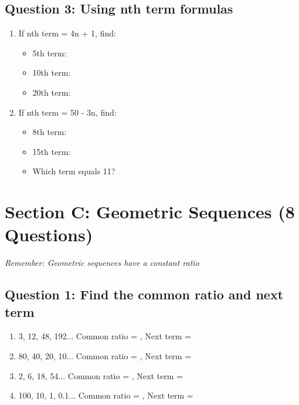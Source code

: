 \documentclass{article}
\begin{document}
\subsection*{Question 3: Using nth term formulas}

\begin{enumerate}
    \item If nth term = 4n + 1, find:
          \begin{itemize}
              \item 5th term: \underline{\hspace{2cm}}
              \item 10th term: \underline{\hspace{2cm}}
              \item 20th term: \underline{\hspace{2cm}}
          \end{itemize}
    
    \item If nth term = 50 - 3n, find:
          \begin{itemize}
              \item 8th term: \underline{\hspace{2cm}}
              \item 15th term: \underline{\hspace{2cm}}
              \item Which term equals 11? \underline{\hspace{2cm}}
          \end{itemize}
\end{enumerate}

\section{Section C: Geometric Sequences (8 Questions)}
\textit{Remember: Geometric sequences have a constant ratio}

\subsection*{Question 1: Find the common ratio and next term}

\begin{enumerate}
    \item 3, 12, 48, 192... Common ratio = \underline{\hspace{1cm}}, Next term = \underline{\hspace{2cm}}
    \item 80, 40, 20, 10... Common ratio = \underline{\hspace{1cm}}, Next term = \underline{\hspace{2cm}}
    \item 2, 6, 18, 54... Common ratio = \underline{\hspace{1cm}}, Next term = \underline{\hspace{2cm}}
    \item 100, 10, 1, 0.1... Common ratio = \underline{\hspace{1cm}}, Next term = \underline{\hspace{2cm}}
\end{enumerate}
\end{document}
